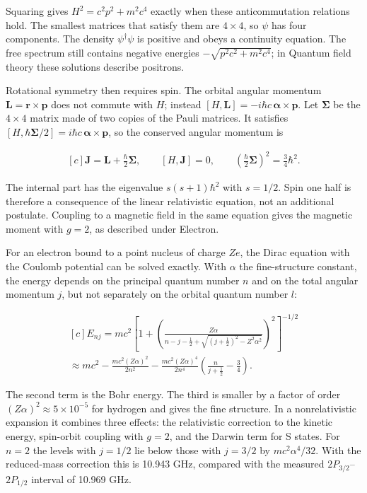 \documentclass[11pt,oneside]{book}
\newenvironment{centeredalign}{\[\begin{gathered}[c]}{\end{gathered}\]}
\begin{document}
Squaring gives \(H^2=c^2p^2+m^2c^4\) exactly when these anticommutation relations hold. The smallest matrices that satisfy them are \(4\times4\), so \(\psi\) has four components. The density \(\psi^\dagger\psi\) is positive and obeys a continuity equation. The free spectrum still contains negative energies \(-\sqrt{p^2c^2+m^2c^4}\); in Quantum field theory these solutions describe positrons.

Rotational symmetry then requires spin. The orbital angular momentum \(\mathbf L=\mathbf r\times\mathbf p\) does not commute with \(H\); instead \([H,\mathbf L]=-i\hbar c\,\boldsymbol\alpha\times\mathbf p\). Let \(\boldsymbol\Sigma\) be the \(4\times4\) matrix made of two copies of the Pauli matrices. It satisfies \([H,\hbar\boldsymbol\Sigma/2]=i\hbar c\,\boldsymbol\alpha\times\mathbf p\), so the conserved angular momentum is

\begin{centeredalign}
\mathbf J=\mathbf L+\frac{\hbar}{2}\boldsymbol\Sigma,\qquad [H,\mathbf J]=0,\qquad
\left(\frac{\hbar}{2}\boldsymbol\Sigma\right)^2=\frac34\hbar^2.
\end{centeredalign}

The internal part has the eigenvalue \(s(s+1)\hbar^2\) with \(s=1/2\). Spin one half is therefore a consequence of the linear relativistic equation, not an additional postulate. Coupling to a magnetic field in the same equation gives the magnetic moment with \(g=2\), as described under Electron.

For an electron bound to a point nucleus of charge \(Ze\), the Dirac equation with the Coulomb potential can be solved exactly. With \(\alpha\) the fine-structure constant, the energy depends on the principal quantum number \(n\) and on the total angular momentum \(j\), but not separately on the orbital quantum number \(l\):

\begin{centeredalign}
E_{nj}=mc^2\left[1+\left(\frac{Z\alpha}{n-j-\frac12+\sqrt{(j+\frac12)^2-Z^2\alpha^2}}\right)^2\right]^{-1/2}\\
\approx mc^2-\frac{mc^2(Z\alpha)^2}{2n^2}
-\frac{mc^2(Z\alpha)^4}{2n^4}\left(\frac{n}{j+\frac12}-\frac34\right).
\end{centeredalign}

The second term is the Bohr energy. The third is smaller by a factor of order \((Z\alpha)^2\approx5\times10^{-5}\) for hydrogen and gives the fine structure. In a nonrelativistic expansion it combines three effects: the relativistic correction to the kinetic energy, spin-orbit coupling with \(g=2\), and the Darwin term for S states. For \(n=2\) the levels with \(j=1/2\) lie below those with \(j=3/2\) by \(mc^2\alpha^4/32\). With the reduced-mass correction this is 10.943 GHz, compared with the measured \(2P_{3/2}\)--\(2P_{1/2}\) interval of 10.969 GHz.
\end{document}
